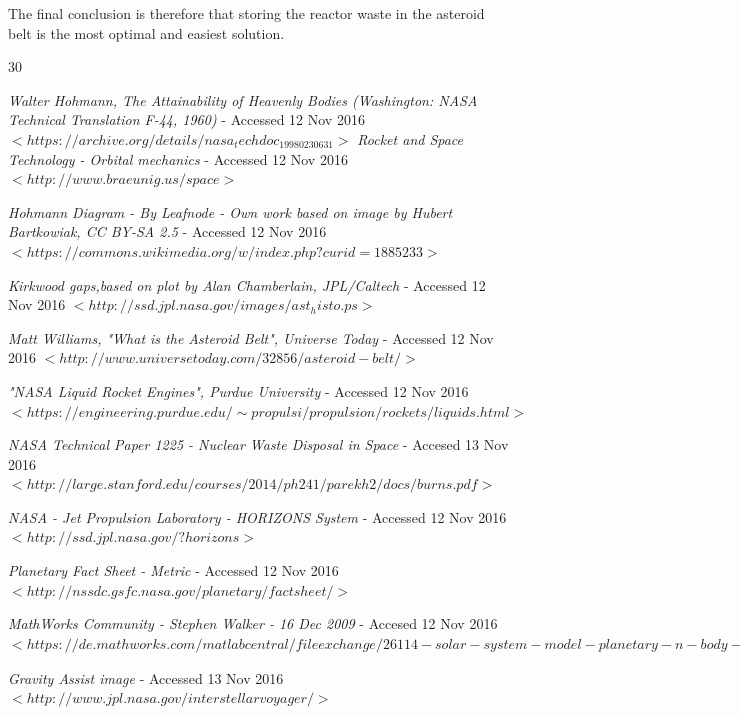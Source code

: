 \documentclass[onecolumn,12pt]{article}
\numberwithin{equation}{section}
\begin{document}
The final conclusion is therefore that storing the reactor waste in the asteroid belt is the most optimal and easiest solution.

\newpage

\onecolumn




\newpage


\newpage

\begin{thebibliography}{30}

\textit{Walter Hohmann, The Attainability of Heavenly Bodies (Washington: NASA Technical Translation F-44, 1960)} -  Accessed 12 Nov 2016
$<https://archive.org/details/nasa_techdoc_19980230631>$
\textit{Rocket and Space Technology - Orbital mechanics} - Accessed 12 Nov 2016
$<http://www.braeunig.us/space>$

\textit{Hohmann Diagram - By Leafnode - Own work based on image by Hubert Bartkowiak, CC BY-SA 2.5} - Accessed 12 Nov 2016
$<https://commons.wikimedia.org/w/index.php?curid=1885233>$

\textit{Kirkwood gaps,based on plot by Alan Chamberlain, JPL/Caltech} - Accessed 12 Nov 2016
$<http://ssd.jpl.nasa.gov/images/ast_histo.ps>$

\textit{Matt Williams, "What is the Asteroid Belt", Universe Today} - Accessed 12 Nov 2016
$<http://www.universetoday.com/32856/asteroid-belt/>$

\textit{"NASA Liquid Rocket Engines", Purdue University} - Accessed 12 Nov 2016
$<https://engineering.purdue.edu/\sim
propulsi/propulsion/rockets/liquids.html>$

\textit{NASA Technical Paper 1225 - Nuclear Waste Disposal in Space} - Accesed 13 Nov 2016
$<http://large.stanford.edu/courses/2014/ph241/parekh2/docs/burns.pdf>$

\textit{NASA - Jet Propulsion Laboratory - HORIZONS System} - Accessed 12 Nov 2016
$<http://ssd.jpl.nasa.gov/?horizons>$

\textit{Planetary Fact Sheet - Metric} - Accessed 12 Nov 2016
$<http://nssdc.gsfc.nasa.gov/planetary/factsheet/>$

\textit{MathWorks Community - Stephen Walker - 16 Dec 2009} - Accesed 12 Nov 2016
$<https://de.mathworks.com/matlabcentral/fileexchange/26114-solar-system-model-planetary-n-body-modelling/content/trajectory_sim.m>$

\textit{Gravity Assist image} - Accessed 13 Nov 2016 $<http://www.jpl.nasa.gov/interstellarvoyager/>$

\end{thebibliography}
\end{document}
